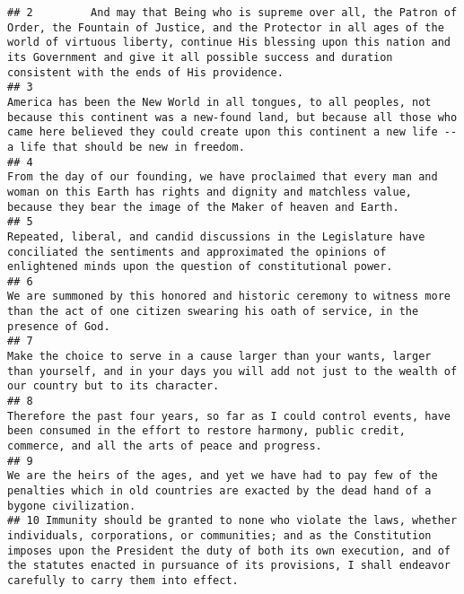 \documentclass[]{article}
\begin{document}
\begin{verbatim}
## 2         And may that Being who is supreme over all, the Patron of Order, the Fountain of Justice, and the Protector in all ages of the world of virtuous liberty, continue His blessing upon this nation and its Government and give it all possible success and duration consistent with the ends of His providence.
## 3                                                                America has been the New World in all tongues, to all peoples, not because this continent was a new-found land, but because all those who came here believed they could create upon this continent a new life -- a life that should be new in freedom.
## 4                                                                                                                     From the day of our founding, we have proclaimed that every man and woman on this Earth has rights and dignity and matchless value, because they bear the image of the Maker of heaven and Earth.
## 5                                                                                                                            Repeated, liberal, and candid discussions in the Legislature have conciliated the sentiments and approximated the opinions of enlightened minds upon the question of constitutional power.
## 6                                                                                                                                                               We are summoned by this honored and historic ceremony to witness more than the act of one citizen swearing his oath of service, in the presence of God.
## 7                                                                                                                                           Make the choice to serve in a cause larger than your wants, larger than yourself, and in your days you will add not just to the wealth of our country but to its character.
## 8                                                                                                                                Therefore the past four years, so far as I could control events, have been consumed in the effort to restore harmony, public credit, commerce, and all the arts of peace and progress.
## 9                                                                                                                                                           We are the heirs of the ages, and yet we have had to pay few of the penalties which in old countries are exacted by the dead hand of a bygone civilization.
## 10 Immunity should be granted to none who violate the laws, whether individuals, corporations, or communities; and as the Constitution imposes upon the President the duty of both its own execution, and of the statutes enacted in pursuance of its provisions, I shall endeavor carefully to carry them into effect.

\end{verbatim}
\end{document}

